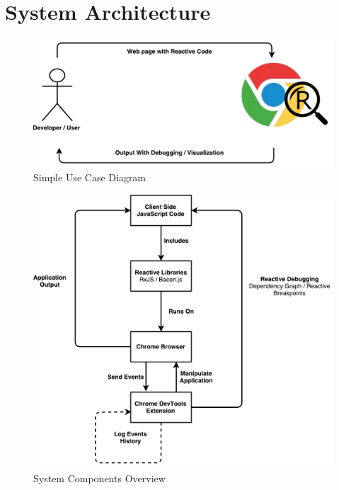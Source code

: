 \section{System Architecture}

\begin{figure}[!h]
	\centering
	\includegraphics[scale=0.5,trim=0 0 0 0]{gfx/system_design_1.pdf}
	\caption{Simple Use Case Diagram}
	\label{fig:system_design_1-a}
\end{figure}

\begin{figure}[!h]
	\centering
	\includegraphics[scale=0.5,trim=0 0 0 0]{gfx/system_design_2.pdf}
	\caption{System Components Overview}
	\label{fig:system_design_2}
\end{figure}

